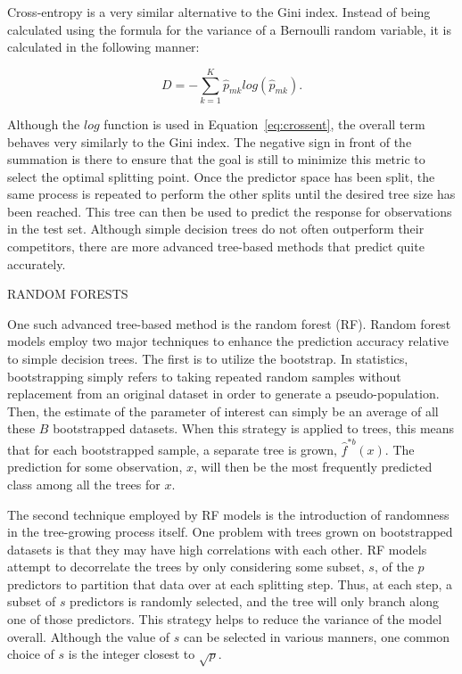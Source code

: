 \documentclass[12pt]{article}
\begin{document}
Cross-entropy is a very similar alternative to the Gini index.  Instead of being 
calculated using the formula for the variance of a Bernoulli random variable, it 
is calculated in the following manner:

\begin{equation}
  \label{eq:crossent}
   D = - \sum_{k = 1} ^ {K} \hat{p}_{mk} log (\hat{p}_{mk}).
\end{equation} 

Although the $log$ function is used in Equation~\eqref{eq:crossent}, the overall 
term behaves very similarly to the Gini index.  The negative sign in front of the 
summation is there to ensure that the goal is still to minimize this metric to 
select the optimal splitting point.  
Once the predictor space has been split, the same process is repeated to perform 
the other splits until the desired tree size has been reached.  This tree can then 
be used to predict the response for observations in the test set.  Although simple 
decision trees do not often outperform their competitors, there are more advanced 
tree-based methods that predict quite accurately.  

RANDOM FORESTS

One such advanced tree-based method is the random forest (RF).  Random forest models 
employ two major techniques to enhance the prediction accuracy relative to simple 
decision trees.  The first is to utilize the bootstrap.  In statistics, bootstrapping 
simply refers to taking repeated random samples without replacement from an original 
dataset in order to generate a pseudo-population.  Then, the estimate of the parameter 
of interest can simply be an average of all these $B$ bootstrapped datasets.  When 
this strategy is applied to trees, this means that for each bootstrapped sample, a 
separate tree is grown, 
$\hat{f} ^ {*b} (x)$.  The prediction for some observation, $x$, will then be the most 
frequently predicted class among all the trees for $x$.  

The second technique employed by RF models is the introduction of randomness in the 
tree-growing process itself.  One problem with trees grown on bootstrapped datasets is 
that they may have high correlations with each other.  RF models attempt to decorrelate 
the trees by only considering some subset, $s$, of the $p$ predictors to partition that 
data over at each splitting step.  Thus, at each step, a subset of $s$ predictors is 
randomly selected, and the tree will only branch along one of those predictors.  This 
strategy helps to reduce the variance of the model overall.  Although the value of $s$ 
can be selected in various manners, one common choice of $s$ is the integer closest to 
$\sqrt{p}$.
\end{document}
